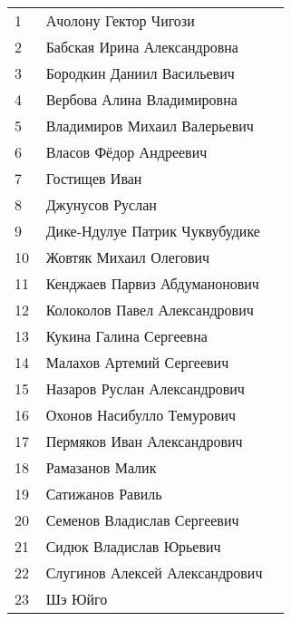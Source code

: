 \documentclass[a4paper,landscape,11pt]{article}
\newcommand*\ok{&{\small \ding{51}}} %
\newcommand*\no{&{\small }} %
\begin{document}
\begin{tabular}{p{7pt}|l|p{6pt}}
\\
\midrule
		1\,&Ачолону Гектор Чигози\no\\
		2\,&Бабская Ирина Александровна\ok\\
		3\,&Бородкин Даниил Васильевич\ok\\
		4\,&Вербова Алина Владимировна\no\\
		5\,&Владимиров Михаил Валерьевич\ok\\
		6\,&Власов Фёдор Андреевич\ok\\
		7\,&Гостищев Иван\ok\\
		8\,&Джунусов Руслан\ok\\
		9\,&Дике-Ндулуе Патрик Чуквубудике\ok\\
		10\,&Жовтяк Михаил Олегович\no\\
		11\,&Кенджаев Парвиз Абдуманонович\ok\\
		12\,&Колоколов Павел Александрович\no\\
		13\,&Кукина Галина Сергеевна\ok\\
		14\,&Малахов Артемий Сергеевич\ok\\
		15\,&Назаров Руслан Александрович\ok\\
		16\,&Охонов Насибулло Темурович\ok\\
		17\,&Пермяков Иван Александрович\ok\\
		18\,&Рамазанов Малик\ok\\
		19\,&Сатижанов Равиль\ok\\
		20\,&Семенов Владислав Сергеевич\ok\\
		21\,&Сидюк Владислав Юрьевич\ok\\
		22\,&Слугинов Алексей Александрович\ok\\
		23\,&Шэ Юйго\ok\\
\bottomrule
\end{tabular} 
\end{document}
